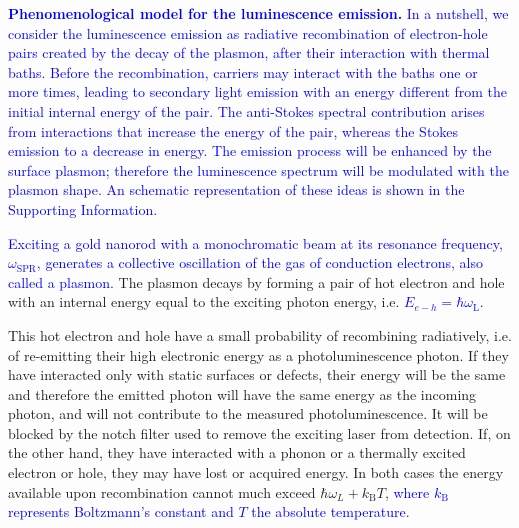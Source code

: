 \documentclass[journal=nalefd,manuscript=letter]{achemso}
\newcommand{\HI}[1]{\textcolor{blue}{#1}} %
\newcommand{\fs}{\ensuremath{\,\textrm{fs}}}
\newcommand{\ps}{\ensuremath{\,\textrm{ps}}}
\begin{document}
\HI{\textbf{Phenomenological model for the luminescence emission.} 
In a nutshell, we consider the luminescence emission as radiative recombination of
electron-hole pairs created by the decay of the plasmon, after their interaction
with thermal baths. Before the recombination, carriers may interact with the baths one or more
times, leading to secondary light emission with an energy different from the initial internal energy of the pair. 
The anti-Stokes spectral contribution arises from interactions that increase the energy 
of the pair, whereas the Stokes emission to a decrease in energy. The emission process will be 
enhanced by the surface plasmon; therefore the luminescence spectrum will be modulated with the plasmon shape. 
An schematic representation of these ideas is shown in the Supporting Information.}

\HI{Exciting a gold nanorod with a monochromatic beam at its resonance frequency, $\omega_\textrm{SPR}$, generates a collective oscillation of the gas of conduction electrons, also called a plasmon.} 
The plasmon decays by forming a pair of hot electron and hole with an internal energy equal to the exciting
photon energy\cite{Sundararaman2014,Brongersma2015,AlejandroManjavacasJunG.LiuVikramKulkarni2014}, 
i.e. \HI{ $E_{e-h}=\hbar \omega_\textrm{L}$.}

This hot electron and hole have a small probability of recombining radiatively, i.e. of 
re-emitting their high electronic energy as a photoluminescence photon. If they
have interacted only with static surfaces or defects, their energy will be the same and
therefore the emitted photon will have the same energy as the incoming
photon, and will not contribute to the measured photoluminescence. It will be
blocked by the notch filter used to remove the exciting laser from detection.
If, on the other hand, they have interacted with a
phonon or a thermally excited electron or hole, they may have lost or acquired
energy.
In both cases the energy available upon
recombination cannot much exceed $\hbar\omega_L+k_\textrm{B}T$, \HI{where $k_\textrm{B}$ 
represents Boltzmann's constant and $T$ the absolute temperature.} 
\end{document}
